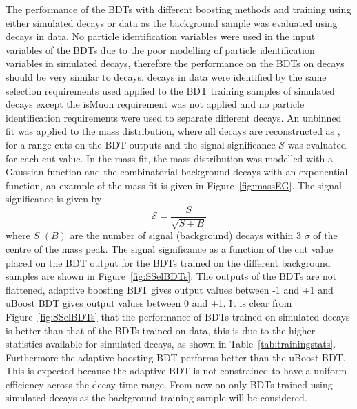 The performance of the BDTs with different boosting methods and training using either simulated decays or data as the background sample was evaluated using \bhh decays in data. No particle identification variables were used in the input variables of the BDTs due to the poor modelling of particle identification variables in simulated decays, therefore the performance on the BDTs on \bhh decays should be very similar to \bsmumu decays. \bhh decays in data were identified by the same selection requirements used applied to the BDT training samples of simulated decays except the isMuon requirement was not applied and no particle identification requirements were used to separate different \bhh decays. An unbinned \ml fit was applied to the \bhh mass distribution, where all \bhh decays are reconstructed as \bsmumu, for a range cuts on the BDT outputs and the signal significance $\mathcal{S}$  was evaluated for each cut value. In the mass fit, the \bhh mass distribution was modelled with a Gaussian function and the combinatorial background decays with an exponential function, an example of the mass fit is given in Figure~\ref{fig:massEG}. The signal significance is given by
\begin{equation}
\mathcal{S} = \frac{S}{\sqrt{S+B}}
\label{eq:SigSigf}
\end{equation} 
where $S$ $(B)$ are the number of signal (background) decays within 3 $\sigma$ of the centre of the \bhh mass peak. 
The signal significance as a function of the cut value placed on the BDT output for the BDTs trained on the different background samples are shown in Figure~\ref{fig:SSelBDTs}. The outputs of the BDTs are not flattened, adaptive boosting BDT gives output values between -1 and +1 and uBoost BDT gives output values between 0 and +1. It is clear from Figure~\ref{fig:SSelBDTs} that the performance of BDTs trained on simulated decays is better than that of the BDTs trained on data, this is due to the higher statistics available for simulated decays, as shown in Table~\ref{tab:trainingstats}. Furthermore the adaptive boosting BDT performs better than the uBoost BDT. This is expected because the adaptive BDT is not constrained to have a uniform efficiency across the decay time range. From now on only BDTs trained using simulated decays as the background training sample will be considered.

